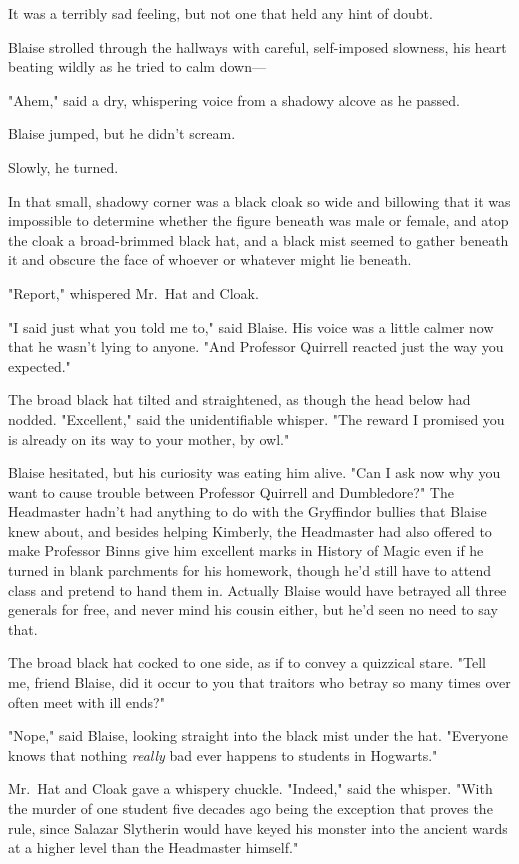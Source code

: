 It was a terribly sad feeling, but not one that held any hint of doubt.

Blaise strolled through the hallways with careful, self-imposed slowness, his
heart beating wildly as he tried to calm down---

"Ahem," said a dry, whispering voice from a shadowy alcove as he passed.

Blaise jumped, but he didn't scream.

Slowly, he turned.

In that small, shadowy corner was a black cloak so wide and billowing that it
was impossible to determine whether the figure beneath was male or female, and
atop the cloak a broad-brimmed black hat, and a black mist seemed to gather
beneath it and obscure the face of whoever or whatever might lie beneath.

"Report," whispered Mr.~Hat and Cloak.

"I said just what you told me to," said Blaise. His voice was a little calmer
now that he wasn't lying to anyone. "And Professor Quirrell reacted just the
way you expected."

The broad black hat tilted and straightened, as though the head below had
nodded. "Excellent," said the unidentifiable whisper. "The reward I promised
you is already on its way to your mother, by owl."

Blaise hesitated, but his curiosity was eating him alive. "Can I ask now why
you want to cause trouble between Professor Quirrell and Dumbledore?" The
Headmaster hadn't had anything to do with the Gryffindor bullies that Blaise
knew about, and besides helping Kimberly, the Headmaster had also offered to
make Professor Binns give him excellent marks in History of Magic even if he
turned in blank parchments for his homework, though he'd still have to attend
class and pretend to hand them in. Actually Blaise would have betrayed all
three generals for free, and never mind his cousin either, but he'd seen no
need to say that.

The broad black hat cocked to one side, as if to convey a quizzical stare.
"Tell me, friend Blaise, did it occur to you that traitors who betray so many
times over often meet with ill ends?"

"Nope," said Blaise, looking straight into the black mist under the hat.
"Everyone knows that nothing \emph{really} bad ever happens to students in
Hogwarts."

Mr.~Hat and Cloak gave a whispery chuckle. "Indeed," said the whisper. "With
the murder of one student five decades ago being the exception that proves the
rule, since Salazar Slytherin would have keyed his monster into the ancient
wards at a higher level than the Headmaster himself."

